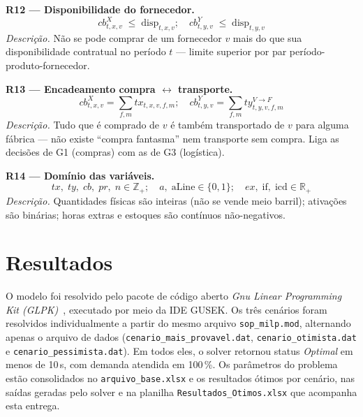 \documentclass[11pt,a4paper]{article}
\begin{document}
\medskip
\noindent\textbf{R12 — Disponibilidade do fornecedor.}
\begin{equation}
cb^X_{t,x,v} \;\leq\; \text{disp}_{t,x,v}; \quad cb^Y_{t,y,v} \;\leq\; \text{disp}_{t,y,v}
\label{eq:R12}
\end{equation}
\emph{Descrição.} Não se pode comprar de um fornecedor $v$ mais do que sua disponibilidade contratual no período $t$ — limite superior por par período-produto-fornecedor.

\medskip
\noindent\textbf{R13 — Encadeamento compra $\leftrightarrow$ transporte.}
\begin{equation}
cb^X_{t,x,v} = \sum_{f,m} tx_{t,x,v,f,m}; \quad cb^Y_{t,y,v} = \sum_{f,m} ty^{V\to F}_{t,y,v,f,m}
\label{eq:R13}
\end{equation}
\emph{Descrição.} Tudo que é comprado de $v$ é também transportado de $v$ para alguma fábrica — não existe ``compra fantasma'' nem transporte sem compra. Liga as decisões de G1 (compras) com as de G3 (logística).

\medskip
\noindent\textbf{R14 — Domínio das variáveis.}
\begin{equation}
tx,\;ty,\;cb,\;pr,\;n \in \mathbb{Z}_+; \quad a,\;\text{aLine} \in \{0,1\}; \quad ex,\;\text{if},\;\text{icd} \in \mathbb{R}_+
\label{eq:R14}
\end{equation}
\emph{Descrição.} Quantidades físicas são inteiras (não se vende meio barril); ativações são binárias; horas extras e estoques são contínuos não-negativos.

\section{Resultados}
\label{sec:resultados}

O modelo foi resolvido pelo pacote de código aberto \emph{Gnu Linear Programming Kit (GLPK)}~\cite{makhorin2015glpk}, executado por meio da IDE GUSEK. Os três cenários foram resolvidos individualmente a partir do mesmo arquivo \texttt{sop\_milp.mod}, alternando apenas o arquivo de dados (\texttt{cenario\_mais\_provavel.dat}, \texttt{cenario\_otimista.dat} e \texttt{cenario\_pessimista.dat}). Em todos eles, o solver retornou status \emph{Optimal} em menos de 10\,s, com demanda atendida em 100\,\%. Os parâmetros do problema estão consolidados no \texttt{arquivo\_base.xlsx} e os resultados ótimos por cenário, nas saídas geradas pelo solver e na planilha \texttt{Resultados\_Otimos.xlsx} que acompanha esta entrega.
\end{document}
